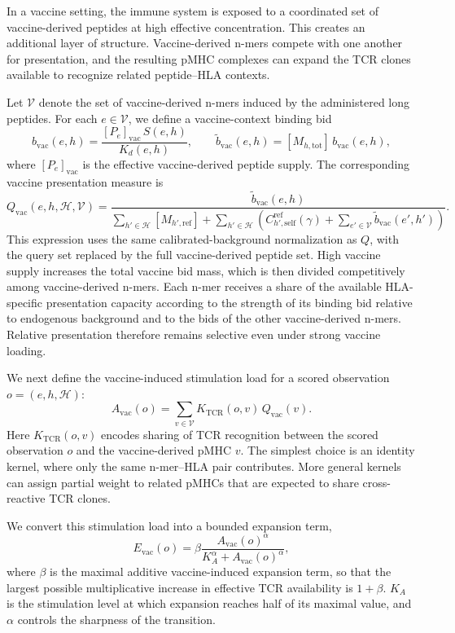 \documentclass[11pt]{article}
\begin{document}
In a vaccine setting, the immune system is exposed to a
coordinated set of vaccine-derived peptides at high effective concentration. This
creates an additional layer of structure. Vaccine-derived n-mers compete with one
another for presentation, and the resulting pMHC complexes can expand the TCR
clones available to recognize related peptide--HLA contexts.

Let \(\mathcal V\) denote the set of vaccine-derived n-mers induced by the
administered long peptides. For each \(e\in\mathcal V\), we define a vaccine-context
binding bid
\[
b_{\mathrm{vac}}(e,h)
=
\frac{[P_e]_{\mathrm{vac}}\,S(e,h)}{K_d(e,h)},
\qquad
\widetilde b_{\mathrm{vac}}(e,h)
=
[M_{h,\mathrm{tot}}]\,b_{\mathrm{vac}}(e,h),
\]
where \([P_e]_{\mathrm{vac}}\) is the effective vaccine-derived peptide supply.
The corresponding vaccine presentation measure is
\[
Q_{\mathrm{vac}}(e,h,\mathcal{H},\mathcal{V})
=
\frac{\widetilde b_{\mathrm{vac}}(e,h)}
{
\sum_{h'\in \mathcal{H}}[M_{h',\mathrm{ref}}]
+
\sum_{h'\in \mathcal{H}}
\left(
C^{\mathrm{ref}}_{h',\mathrm{self}}(\gamma)
+
\sum_{e'\in\mathcal V}
\widetilde b_{\mathrm{vac}}(e',h')
\right)
}.
\]
This expression uses the same calibrated-background normalization as \(Q\), with
the query set replaced by the full vaccine-derived peptide set. High vaccine
supply increases the total vaccine bid mass, which is then divided
competitively among vaccine-derived n-mers. Each n-mer receives a share of the
available HLA-specific presentation capacity according to the strength of its
binding bid relative to endogenous background and to the bids of the other
vaccine-derived n-mers. Relative presentation therefore remains selective even
under strong vaccine loading.

We next define the vaccine-induced stimulation load for a scored observation
\(o=(e,h,\mathcal{H})\):
\[
A_{\mathrm{vac}}(o)
=
\sum_{v\in\mathcal V}
K_{\mathrm{TCR}}(o,v)\,
Q_{\mathrm{vac}}(v).
\]
Here \(K_{\mathrm{TCR}}(o,v)\) encodes sharing of TCR recognition between the scored
observation \(o\) and the vaccine-derived pMHC \(v\). The simplest choice is an
identity kernel, where only the same n-mer--HLA pair contributes. More general
kernels can assign partial weight to related pMHCs that are expected to share
cross-reactive TCR clones.

We convert this stimulation load into a bounded expansion term,
\[
E_{\mathrm{vac}}(o)
=
\beta
\frac{A_{\mathrm{vac}}(o)^\alpha}
     {K_A^\alpha + A_{\mathrm{vac}}(o)^\alpha},
\]
where \(\beta\) is the maximal additive vaccine-induced expansion term, so that
the largest possible multiplicative increase in effective TCR availability is
\(1+\beta\). \(K_A\) is the stimulation level at which expansion reaches half
of its maximal value, and \(\alpha\) controls the sharpness of the transition.
\end{document}
